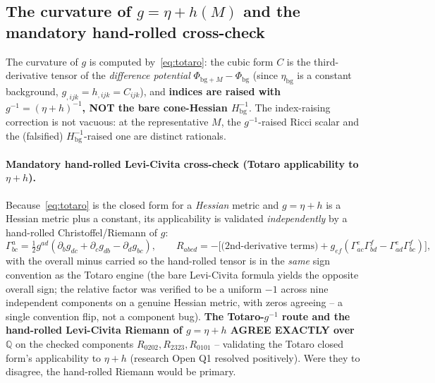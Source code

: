 \subsection{The curvature of $g=\eta+h(M)$ and the mandatory hand-rolled cross-check}
\label{sec:curv-of-g}

The curvature of $g$ is computed by~\eqref{eq:totaro}: the cubic form $C$ is the
third-derivative tensor of the \emph{difference potential}
$\Phi_{\mathrm{bg}+M}-\Phi_{\mathrm{bg}}$ (since $\eta_{\mathrm{bg}}$ is a constant
background, $g_{,ijk}=h_{,ijk}=C_{ijk}$), and \textbf{indices are raised with
$g^{-1}=(\eta+h)^{-1}$, NOT the bare cone-Hessian $H_{\mathrm{bg}}^{-1}$}. The
index-raising correction is not vacuous: at the representative $M$, the
$g^{-1}$-raised Ricci scalar and the (falsified) $H_{\mathrm{bg}}^{-1}$-raised one are
distinct rationals.

\paragraph{Mandatory hand-rolled Levi-Civita cross-check (Totaro applicability to
$\eta+h$).} Because~\eqref{eq:totaro} is the closed form for a \emph{Hessian} metric
and $g=\eta+h$ is a Hessian metric plus a constant, its applicability is validated
\emph{independently} by a hand-rolled Christoffel/Riemann of $g$:
\begin{equation}
  \Gamma^a_{bc}=\tfrac12 g^{ad}(\partial_b g_{dc}+\partial_c g_{db}-\partial_d g_{bc}),
  \qquad
  R_{abcd}=-\big[\text{(2nd-derivative terms)}+g_{ef}(\Gamma^e_{ac}\Gamma^f_{bd}
                 -\Gamma^e_{ad}\Gamma^f_{bc})\big],
\end{equation}
with the overall minus carried so the hand-rolled tensor is in the \emph{same} sign
convention as the Totaro engine (the bare Levi-Civita formula yields the opposite
overall sign; the relative factor was verified to be a uniform $-1$ across nine
independent components on a genuine Hessian metric, with zeros agreeing -- a single
convention flip, not a component bug). \textbf{The Totaro-$g^{-1}$ route and the
hand-rolled Levi-Civita Riemann of $g=\eta+h$ AGREE EXACTLY over $\mathbb{Q}$} on the
checked components $R_{0202},R_{2323},R_{0101}$ -- validating the Totaro closed form's
applicability to $\eta+h$ (research Open Q1 resolved positively). Were they to
disagree, the hand-rolled Riemann would be primary.

